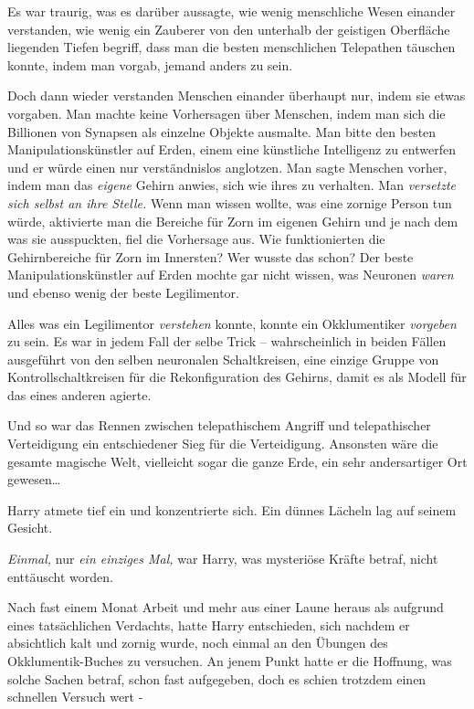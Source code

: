 {Es war traurig, was es darüber aussagte, wie wenig menschliche Wesen einander verstanden, wie wenig ein Zauberer von den unterhalb der geistigen Oberfläche liegenden Tiefen begriff, dass man die besten menschlichen Telepathen täuschen konnte, indem man vorgab, jemand anders zu sein.

Doch dann wieder verstanden Menschen einander überhaupt nur, indem sie etwas vorgaben. Man machte keine Vorhersagen über Menschen, indem man sich die Billionen von Synapsen als einzelne Objekte ausmalte. Man bitte den besten Manipulationskünstler auf Erden, einem eine künstliche Intelligenz zu entwerfen und er würde einen nur verständnislos anglotzen. Man sagte Menschen vorher, indem man das \emph{eigene} Gehirn anwies, sich wie ihres zu verhalten. Man \emph{versetzte sich selbst an ihre Stelle.} Wenn man wissen wollte, was eine zornige Person tun würde, aktivierte man die Bereiche für Zorn im eigenen Gehirn und je nach dem was sie ausspuckten, fiel die Vorhersage aus. Wie funktionierten die Gehirnbereiche für Zorn im Innersten? Wer wusste das schon? Der beste Manipulationskünstler auf Erden mochte gar nicht wissen, was Neuronen \emph{waren} und ebenso wenig der beste Legilimentor.

Alles was ein Legilimentor \emph{verstehen} konnte, konnte ein Okklumentiker \emph{vorgeben} zu sein. Es war in jedem Fall der selbe Trick -- wahrscheinlich in beiden Fällen ausgeführt von den selben neuronalen Schaltkreisen, eine einzige Gruppe von Kontrollschaltkreisen für die Rekonfiguration des Gehirns, damit es als Modell für das eines anderen agierte.

Und so war das Rennen zwischen telepathischem Angriff und telepathischer Verteidigung ein entschiedener Sieg für die Verteidigung. Ansonsten wäre die gesamte magische Welt, vielleicht sogar die ganze Erde, ein sehr andersartiger Ort gewesen…

Harry atmete tief ein und konzentrierte sich. Ein dünnes Lächeln lag auf seinem Gesicht.

\emph{Einmal,} nur \emph{ein einziges Mal,} war Harry, was mysteriöse Kräfte betraf, nicht enttäuscht worden.

Nach fast einem Monat Arbeit und mehr aus einer Laune heraus als aufgrund eines tatsächlichen Verdachts, hatte Harry entschieden, sich nachdem er absichtlich kalt und zornig wurde, noch einmal an den Übungen des Okklumentik-Buches zu versuchen. An jenem Punkt hatte er die Hoffnung, was solche Sachen betraf, schon fast aufgegeben, doch es schien trotzdem einen schnellen Versuch wert -

}
